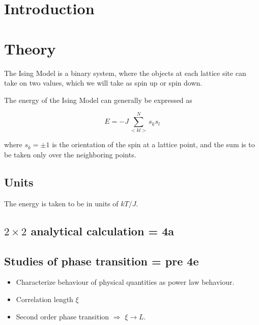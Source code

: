 \documentclass[10pt]{article}
\begin{document}
\newpage



\begin{multicols}{2}
\tableofcontents

{}

\section{Introduction}

\section{Theory}
The Ising Model is a binary system, where the objects at each lattice site
can take on two values, which we will take as spin up or spin down.

The energy of the Ising Model can generally be expressed as

\begin{equation}
    E = -J \sum_{<kl>}^N s_k s_l
\end{equation}

where $s_k = \pm 1$ is the orientation of the spin at a lattice point, and
the sum is to be taken only over the neighboring points.

\subsection{Units}
The energy is taken to be in units of $kT/J$.

\subsection{$2\times 2$ analytical calculation = 4a} 
\label{sub:2x2latticetheory}

\subsection{Studies of phase transition = pre 4e} 
\begin{itemize}
    \item Characterize behaviour of physical quantities as power law
        behaviour. 
    \item Correlation length $\xi$
    \item Second order phase transition $\Rightarrow$ $\xi \to L$.
\end{itemize}


\end{multicols}
\end{document}
